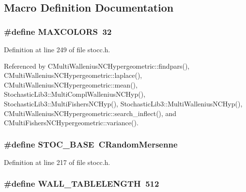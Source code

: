 \subsection{Macro Definition Documentation}
\subsubsection[{M\-A\-X\-C\-O\-L\-O\-R\-S}]{\setlength{\rightskip}{0pt plus 5cm}\#define M\-A\-X\-C\-O\-L\-O\-R\-S~32}\label{rnd_2stocc_8h_a653a781f54d9d640c5dc8eb5360892a9}


Definition at line 249 of file stocc.\-h.



Referenced by C\-Multi\-Wallenius\-N\-C\-Hypergeometric\-::findpars(), C\-Multi\-Wallenius\-N\-C\-Hypergeometric\-::laplace(), C\-Multi\-Wallenius\-N\-C\-Hypergeometric\-::mean(), Stochastic\-Lib3\-::\-Multi\-Compl\-Wallenius\-N\-C\-Hyp(), Stochastic\-Lib3\-::\-Multi\-Fishers\-N\-C\-Hyp(), Stochastic\-Lib3\-::\-Multi\-Wallenius\-N\-C\-Hyp(), C\-Multi\-Wallenius\-N\-C\-Hypergeometric\-::search\-\_\-inflect(), and C\-Multi\-Fishers\-N\-C\-Hypergeometric\-::variance().

\subsubsection[{S\-T\-O\-C\-\_\-\-B\-A\-S\-E}]{\setlength{\rightskip}{0pt plus 5cm}\#define S\-T\-O\-C\-\_\-\-B\-A\-S\-E~C\-Random\-Mersenne}\label{rnd_2stocc_8h_ae92ade333504bafa01e6ee3a8945eb64}


Definition at line 217 of file stocc.\-h.

\subsubsection[{W\-A\-L\-L\-\_\-\-T\-A\-B\-L\-E\-L\-E\-N\-G\-T\-H}]{\setlength{\rightskip}{0pt plus 5cm}\#define W\-A\-L\-L\-\_\-\-T\-A\-B\-L\-E\-L\-E\-N\-G\-T\-H~512}\label{rnd_2stocc_8h_a84dc7bdd140e3283b2cc357a8b8c2a71}



